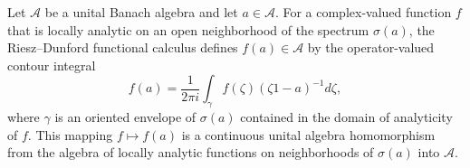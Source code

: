 Let $\mathcal{A}$ be a unital Banach algebra and let $a \in \mathcal{A}$. For a complex-valued function $f$ that is locally analytic on an open neighborhood of the spectrum $\sigma(a)$, the Riesz--Dunford functional calculus defines $f(a) \in \mathcal{A}$ by the operator-valued contour integral
$$f(a) = \frac{1}{2\pi i} \int_{\gamma} f(\zeta) (\zeta 1 - a)^{-1} d\zeta,$$
where $\gamma$ is an oriented envelope of $\sigma(a)$ contained in the domain of analyticity of $f$. This mapping $f \mapsto f(a)$ is a continuous unital algebra homomorphism from the algebra of locally analytic functions on neighborhoods of $\sigma(a)$ into $\mathcal{A}$.
